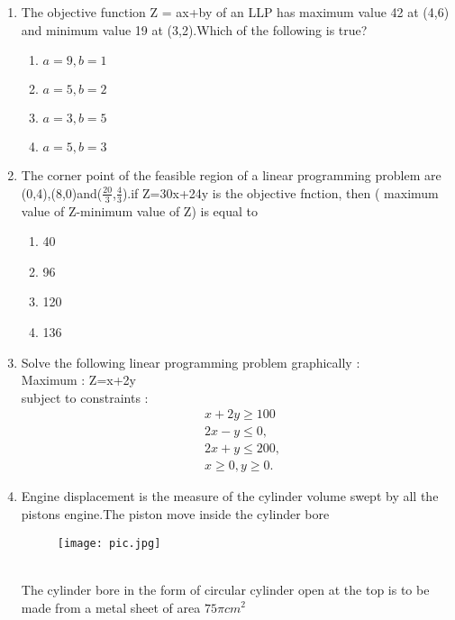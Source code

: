 \documentclass{article}
\begin{document}
\begin{enumerate}
	\item The objective function Z = ax+by of an LLP has maximum value 42 at (4,6) and minimum value 19 at (3,2).Which of the following is true?
		
  		\begin{enumerate}
				\item $a=9,b=1$
		        	\item $a=5,b=2$
				\item $a= 3,b=5$
				\item $a=5,b=3$
			
		\end{enumerate}
		
	\item The corner point of the feasible region of a linear programming problem are (0,4),(8,0)and($\frac{20}{3}$,$\frac{4}{3}$).if Z=30x+24y is the objective fnction, then ( maximum value of Z-minimum value of Z) is equal to 
		
		\begin{enumerate}
				\item 40
				\item 96
				\item 120
				\item 136
		\end{enumerate}
		
		
	\item 
	 Solve the following linear programming problem graphically :\\ 
			Maximum : Z=x+2y \\
	subject to constraints :
	\begin{align}& x+2y\ge100\nonumber\\
	& 2x-y\le0,\nonumber\\
	     & 2x+y\le200,\nonumber\\
	     & x\ge0,y\ge0.\nonumber\end{align}
					

			      \item
		Engine displacement is the measure of the cylinder volume swept by all the pistons engine.The piston move inside the cylinder bore \\
		\begin{figure}[htbp]
		\texttt{[image: pic.jpg]}\\
	        \end{figure}\\
		The cylinder bore in the form of circular cylinder open at the top is to be made from a metal sheet of area $ 75 \pi cm^2 $ \\
 	

\end{enumerate}
\end{document}
